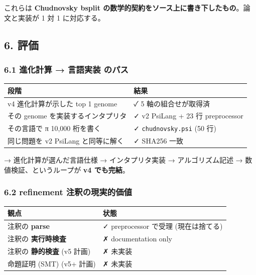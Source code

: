 \documentclass[
]{ltjsarticle}
\newcounter{none} %
\begin{document}
これらは \textbf{Chudnovsky bsplit
の数学的契約をソース上に書き下したもの}。論文と実装が 1 対 1
に対応する。

\subsection{6. 評価}\label{ux8a55ux4fa1}

\subsubsection{6.1 進化計算 → 言語実装
のパス}\label{ux9032ux5316ux8a08ux7b97-ux8a00ux8a9eux5b9fux88c5-ux306eux30d1ux30b9}

{\def\LTcaptype{none} %
\begin{longtable}[]{@{}
  >{\raggedright\arraybackslash}p{}
  >{\raggedright\arraybackslash}p{}@{}}
\toprule\noalign{}
\begin{minipage}[b]{\linewidth}\raggedright
段階
\end{minipage} & \begin{minipage}[b]{\linewidth}\raggedright
結果
\end{minipage} \\
\midrule\noalign{}
\endhead
\bottomrule\noalign{}
\endlastfoot
v4 進化計算が示した top 1 genome & ✓ 5 軸の組合せが取得済 \\
その genome を実装するインタプリタ & ✓ v2 PsiLang + 23 行
preprocessor \\
その言語で π 10,000 桁を書く & ✓ \texttt{chudnovsky.psi} (50 行) \\
同じ問題を v2 PsiLang と同等に解く & ✓ SHA256 一致 \\
\end{longtable}
}

→ 進化計算が選んだ言語仕様 → インタプリタ実装 → アルゴリズム記述 →
数値検証、というループが \textbf{v4 でも完結}。

\subsubsection{6.2 refinement
注釈の現実的価値}\label{refinement-ux6ce8ux91c8ux306eux73feux5b9fux7684ux4fa1ux5024}

{\def\LTcaptype{none} %
\begin{longtable}[]{@{}ll@{}}
\toprule\noalign{}
観点 & 状態 \\
\midrule\noalign{}
\endhead
\bottomrule\noalign{}
\endlastfoot
注釈の \textbf{parse} & ✓ preprocessor で受理 (現在は捨てる) \\
注釈の \textbf{実行時検査} & ✗ documentation only \\
注釈の \textbf{静的検査} (v5 計画) & ✗ 未実装 \\
命題証明 (SMT) (v5+ 計画) & ✗ 未実装 \\
\end{longtable}
}
\end{document}
